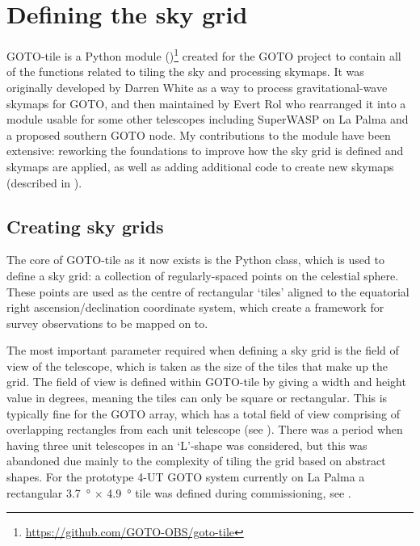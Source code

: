 \section{Defining the sky grid}
\label{sec:gototile}
\begin{colsection}


\begin{colsection}

GOTO-tile is a Python module ()\footnote{\url{https://github.com/GOTO-OBS/goto-tile}} created for the GOTO project to contain all of the functions related to tiling the sky and processing skymaps. It was originally developed by Darren White as a way to process gravitational-wave skymaps for GOTO, and then maintained by Evert Rol who rearranged it into a module usable for some other telescopes including SuperWASP on La Palma and a proposed southern GOTO node. My contributions to the module have been extensive: reworking the foundations to improve how the sky grid is defined and skymaps are applied, as well as adding additional code to create new skymaps (described in ).

\end{colsection}


\subsection{Creating sky grids}
\label{sec:grids}
\begin{colsection}

The core of GOTO-tile as it now exists is the  Python class, which is used to define a sky grid: a collection of regularly-spaced points on the celestial sphere. These points are used as the centre of rectangular `tiles' aligned to the equatorial right ascension/declination coordinate system, which create a framework for survey observations to be mapped on to.

The most important parameter required when defining a sky grid is the field of view of the telescope, which is taken as the size of the tiles that make up the grid. The field of view is defined within GOTO-tile by giving a width and height value in degrees, meaning the tiles can only be square or rectangular. This is typically fine for the GOTO array, which has a total field of view comprising of overlapping rectangles from each unit telescope (see ). There was a period when having three unit telescopes in an `L'-shape was considered, but this was abandoned due mainly to the complexity of tiling the grid based on abstract shapes. For the prototype 4-UT GOTO system currently on La Palma a rectangular \SI{3.7}{\degree} $\times$ \SI{4.9}{\degree} tile was defined during commissioning, see .


\end{colsection}
\end{colsection}
